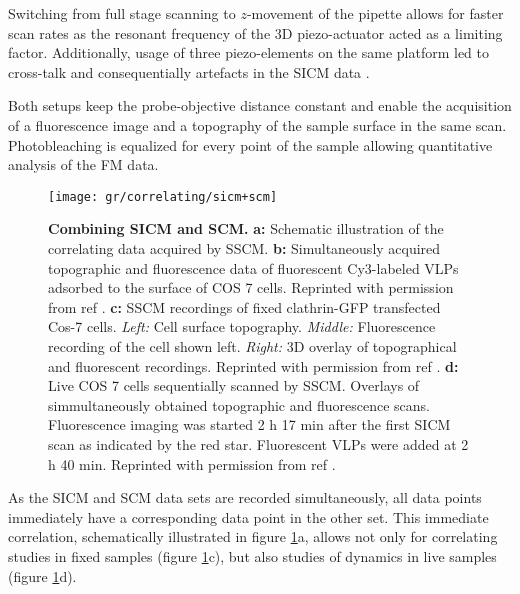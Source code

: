 Switching from full stage scanning to $z$-movement of the pipette allows for
faster scan rates as the resonant frequency of the 3D piezo-actuator acted as
a limiting factor. Additionally, usage of three piezo-elements on the same
platform led to cross-talk and consequentially artefacts in the SICM data
\cite{Shevchuk2013}. 


Both setups keep the probe-objective distance constant and enable the acquisition of a fluorescence
image and a topography of the sample surface in the same scan. Photobleaching is equalized for every
point of the sample allowing quantitative analysis of the FM data.

\begin{figure}
  \texttt{[image: gr/correlating/sicm+scm]}
  \caption{%
    \textbf{Combining SICM and SCM.}
    \textbf{a:} Schematic illustration of the correlating data acquired by SSCM.
    \textbf{b:} Simultaneously acquired topographic and fluorescence data of fluorescent Cy3-labeled 
    VLPs adsorbed to the surface of COS 7 cells. Reprinted with permission from ref \cite{Gorelik2002}.
    \textbf{c:} SSCM recordings of fixed clathrin-GFP transfected Cos-7 cells. 
    	\textit{Left:} Cell surface topography. 
    	\textit{Middle:} Fluorescence recording of the cell shown left. 
    	\textit{Right:} 3D overlay of topographical and fluorescent recordings. 
    Reprinted with permission from ref \cite{Shevchuk2008}.
    \textbf{d:} Live COS 7 cells sequentially scanned by SSCM. Overlays of simmultaneously obtained 
    topographic and fluorescence scans. Fluorescence imaging was started 2 h 17 min after the first 
    SICM scan as indicated by the red star. Fluorescent VLPs were added at 2 h 40 min. 
    Reprinted with permission from ref \cite{Gorelik2002}.
  }
  \label{fig:sicm+scm}
\end{figure}

As the SICM and SCM data sets are recorded simultaneously, all data points immediately have a
corresponding data point in the other set. This immediate correlation, schematically illustrated in
figure \ref{fig:sicm+scm}a, allows not only for correlating studies in fixed samples (figure 
\ref{fig:sicm+scm}c), but also studies of dynamics in live samples (figure \ref{fig:sicm+scm}d).


